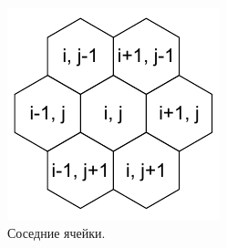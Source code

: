 \begin{figure}[h]
\begin{center}
\begin{minipage}[h]{0.47\linewidth}
			\includegraphics[width=1\linewidth]{inc/img/neibs}
			\caption{Соседние ячейки.}
			\label{axis:axial}
		\end{minipage}
	\end{center}
\end{figure}

